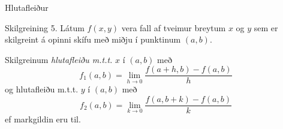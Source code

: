 \date{19.~janúar 2015}



\begin{frame}
	\maketitle
\end{frame}





\begin {frame}{Hlutafleiður}
\begin {block}{Skilgreining 5.}
 Látum $f(x,y)$ vera fall af tveimur breytum $x$ og $y$ sem er skilgreint á opinni skífu með miðju í punktinum $(a,b)$. 
 
 \medskip
 Skilgreinum \emph{hlutafleiðu m.t.t.} $x$ í $(a,b)$ með
$$f_1(a,b)=\lim_{h\rightarrow 0}\frac{f(a+h,b)-f(a,b)}{h}$$
og {hlutafleiðu m.t.t.} $y$ í $(a,b)$ með
$$f_2(a,b)=\lim_{k\rightarrow 0}\frac{f(a,b+k)-f(a,b)}{k}$$
ef markgildin eru til.

\end{block}

\end{frame}

